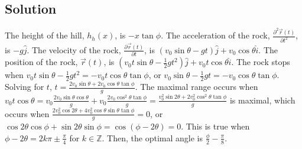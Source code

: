 \documentclass[solutions]{esg8012pset}
\begin{document}
\subsection{Solution}
  The height of the hill, $h_h(x)$, is $-x\tan \phi$.  The acceleration of the rock, $\frac{\partial^2 \vec r(t)}{\partial t^2}$, is $-g\hat j$.  The velocity of the rock, $\frac{\partial \vec r(t)}{\partial t}$, is $(v_0\sin\theta -gt)\hat j + v_0\cos\theta \hat i$.  The position of the rock, $\vec r(t)$, is $\left(v_0 t\sin\theta -\frac{1}{2}gt^2\right)\hat j + v_0 t\cos\theta \hat i$.  The rock stops when $v_0 t\sin\theta -\frac{1}{2}gt^2 = -v_0 t \cos\theta\tan \phi$, or $v_0\sin\theta -\frac{1}{2}gt = -v_0 \cos\theta\tan \phi$.  Solving for $t$, $t = \frac{2v_0\sin\theta + 2v_0 \cos\theta\tan \phi}{g}$.  The maximal range occurs when $v_0 t\cos\theta = v_0 \frac{2v_0\sin\theta\cos\theta}{g} + v_0\frac{2v_0 \cos^2\theta\tan \phi}{g} = \frac{v_0^2\sin2\theta + 2v_0^2 \cos^2\theta\tan \phi}{g}$ is maximal, which occurs when $\frac{2v_0^2\cos2\theta + 4v_0^2 \cos\theta\sin\theta\tan \phi}{g} = 0$, or $\cos2\theta\cos\phi + \sin2\theta\sin \phi = \cos(\phi - 2\theta) = 0$.  This is true when $\phi - 2\theta = 2k\pi \pm \frac{\pi}{4}$ for $k\in\mathbb{Z}$.  Then, the optimal angle is $\frac{\phi}{2} - \frac{\pi}{8}$.
\end{document}
